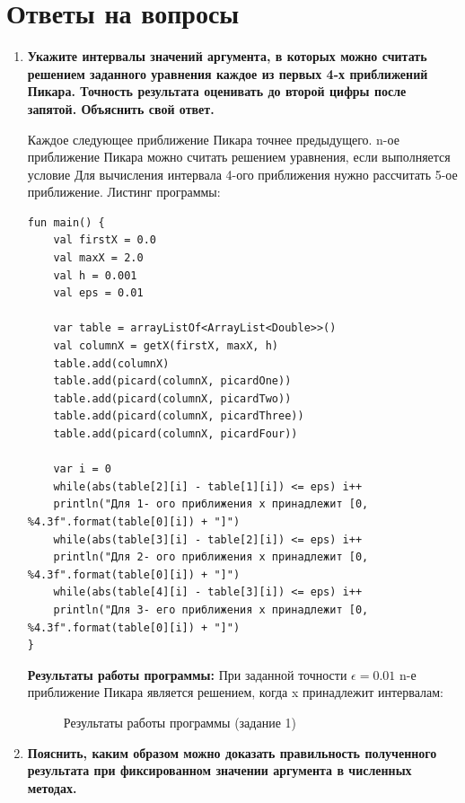 \section{Ответы на вопросы}
\begin{enumerate}
    \item \textbf{Укажите интервалы значений аргумента, в которых можно считать решением заданного уравнения каждое из первых 4-х приближений Пикара. Точность результата оценивать до второй цифры после запятой. Объяснить свой ответ.}
    
    Каждое следующее приближение Пикара точнее предыдущего. n-ое приближение Пикара можно считать решением уравнения, если выполняется условие 
    Для вычисления интервала 4-ого приближения нужно рассчитать 5-ое приближение. \newline
    Листинг программы:
    \begin{lstlisting}
fun main() {
    val firstX = 0.0
    val maxX = 2.0
    val h = 0.001
    val eps = 0.01

    var table = arrayListOf<ArrayList<Double>>()
    val columnX = getX(firstX, maxX, h)
    table.add(columnX)
    table.add(picard(columnX, picardOne))
    table.add(picard(columnX, picardTwo))
    table.add(picard(columnX, picardThree))
    table.add(picard(columnX, picardFour))

    var i = 0
    while(abs(table[2][i] - table[1][i]) <= eps) i++
    println("Для 1- ого приближения x принадлежит [0, %4.3f".format(table[0][i]) + "]")
    while(abs(table[3][i] - table[2][i]) <= eps) i++
    println("Для 2- ого приближения x принадлежит [0, %4.3f".format(table[0][i]) + "]")
    while(abs(table[4][i] - table[3][i]) <= eps) i++
    println("Для 3- его приближения x принадлежит [0, %4.3f".format(table[0][i]) + "]")
}
    \end{lstlisting}
    \textbf{Результаты работы программы:}
    При заданной точности $\epsilon = 0.01$ n-е приближение Пикара является решением, когда x принадлежит интервалам:
    \begin{figure}[h!]
        \caption{Результаты работы программы (задание 1)}
    \end{figure}
    \newline\newline\newline
    \item \textbf{Пояснить, каким образом можно доказать правильность полученного результата при фиксированном значении аргумента в численных методах.}
    

\end{enumerate}

